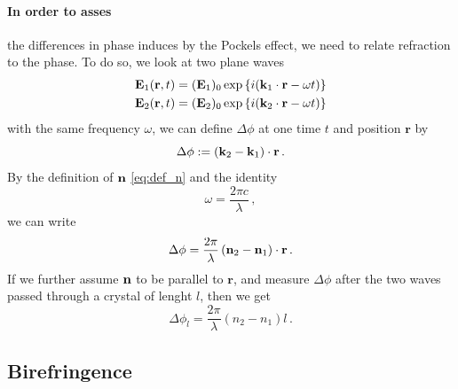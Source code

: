 \paragraph{In order to asses} 
the differences in phase induces by the Pockels effect, we need to 
relate refraction to the phase. To do so, we look at two plane waves  
\begin{align}
\mathbf{E}_1(\mathbf{r}, t) = (\mathbf{E}_1)_0 \exp\left\{i(\mathbf{k}_1 \cdot \mathbf{r} - \omega t) \right\} \\ 
\mathbf{E}_2(\mathbf{r}, t) = (\mathbf{E}_2)_0 \exp\left\{i(\mathbf{k}_2 \cdot \mathbf{r} - \omega t) \right\} \\ 
\end{align}
with the same frequency $\omega$,
we can define $\Delta \phi$ at 
one time $t$ and position $\mathbf{r}$ by 
\begin{equation}
    \Delta \phi := \left(\mathbf{k}_2 - \mathbf{k}_1 \right) \cdot \mathbf{r}\, .
\end{equation}
By the definition of $\mathbf{n}$ \eqref{eq:def_n} and the identity 
\begin{equation}
    \omega = \frac{2 \pi c}{\lambda} \, ,
\end{equation}
we can write 
\begin{equation}
    \Delta \phi = \frac{2 \pi}{\lambda} 
    \left(\mathbf{n}_2 - \mathbf{n}_1 \right) \cdot \mathbf{r} \, .
\end{equation}
If we further assume $\mathbf{n}$ to be parallel to $\mathbf{r}$, 
and measure $\Delta \phi$ after the two waves passed 
through a crystal of lenght $l$, then we get
\begin{equation}
    \Delta \phi_l = \frac{2 \pi}{\lambda} 
    \left(n_2 - n_1 \right) l \, .
    \label{eq:dphi}
\end{equation}


\subsection{Birefringence}
